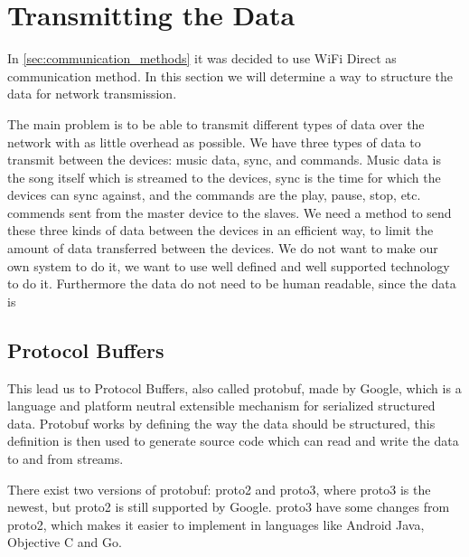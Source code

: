\newpage
\section{Transmitting the Data}
In \cref{sec:communication_methods} it was decided to use WiFi Direct as communication method.
In this section we will determine a way to structure the data for network transmission.

\bigskip

The main problem is to be able to transmit different types of data over the network with as little overhead as possible.
We have three types of data to transmit between the devices: music data, sync, and commands. 
Music data is the song itself which is streamed to the devices,
sync is the time for which the devices can sync against, and the commands are the play, pause, stop, etc. commends sent from the master device to the slaves. 
We need a method to send these three kinds of data between the devices in an efficient way,
to limit the amount of data transferred between the devices.
We do not want to make our own system to do it, we want to use well defined and well supported technology to do it.
Furthermore the data do not need to be human readable, since the data is 

\subsection{Protocol Buffers}
This lead us to Protocol Buffers, also called protobuf, made by Google, which is a language and platform neutral extensible mechanism for serialized structured data. 
Protobuf works by defining the way the data should be structured, this definition is then used to generate source code which can read and write the data to and from streams.\cite{protobuf}

There exist two versions of protobuf: proto2 and proto3, where proto3 is the newest, but proto2 is still supported by Google\cite{proto3}.
proto3 have some changes from proto2, which makes it easier to implement in languages like Android Java, Objective C and Go\cite{proto3}.





\bigskip

\iffalse
binary files
Kunne sende forskellige former for pakker med så lidt overhead som muligt.
Gad ikke lave vores egen.
sende data med så lidt overhead som muligt, ingen grund til human readable
send both control and sound.


Kender ikke pakke formatet, sende først tal som siger hvilken type pakke det er, der efter længden af protobuffen, derefter læses bufferen.
\fi